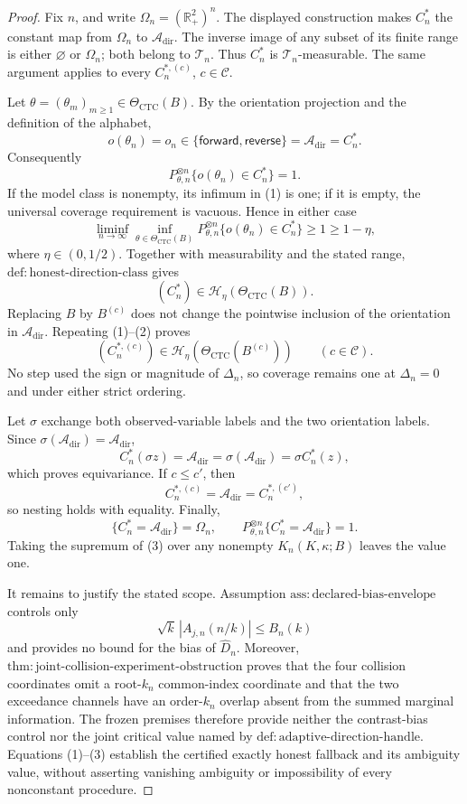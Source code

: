 \documentclass{article}
\begin{document}
\begin{proof}
Fix \(n\), and write \(\Omega_n=(\mathbb R_+^2)^n\).  The displayed construction makes \(C_n^*\) the constant map from \(\Omega_n\) to \(\mathcal A_{\mathrm{dir}}\).  The inverse image of any subset of its finite range is either \(\varnothing\) or \(\Omega_n\); both belong to \(\mathcal T_n\).  Thus \(C_n^*\) is \(\mathcal T_n\)-measurable.  The same argument applies to every \(C_n^{*,(c)}\), \(c\in\mathcal C\).

Let \(\theta=(\theta_m)_{m\geq1}\in\Theta_{\mathrm{CTC}}(B)\).  By the orientation projection and the definition of the alphabet,
\[
 o(\theta_n)=o_n\in\{\mathsf{forward},\mathsf{reverse}\}
 =\mathcal A_{\mathrm{dir}}=C_n^*.
\]
Consequently
\[
 P_{\theta,n}^{\otimes n}\{o(\theta_n)\in C_n^*\}=1. \tag{1}
\]
If the model class is nonempty, its infimum in (1) is one; if it is empty, the universal coverage requirement is vacuous.  Hence in either case
\[
 \liminf_{n\to\infty}\inf_{\theta\in\Theta_{\mathrm{CTC}}(B)}
 P_{\theta,n}^{\otimes n}\{o(\theta_n)\in C_n^*\}
 \geq1\geq1-\eta,
\]
where \(\eta\in(0,1/2)\).  Together with measurability and the stated range, \(\mathrm{def{:}honest\text{-}direction\text{-}class}\) gives
\[
 (C_n^*)\in\mathcal H_\eta(\Theta_{\mathrm{CTC}}(B)). \tag{2}
\]
Replacing \(B\) by \(B^{(c)}\) does not change the pointwise inclusion of the orientation in \(\mathcal A_{\mathrm{dir}}\).  Repeating (1)--(2) proves
\[
 (C_n^{*,(c)})\in\mathcal H_\eta(\Theta_{\mathrm{CTC}}(B^{(c)}))
 \qquad(c\in\mathcal C).
\]
No step used the sign or magnitude of \(\Delta_n\), so coverage remains one at \(\Delta_n=0\) and under either strict ordering.

Let \(\sigma\) exchange both observed-variable labels and the two orientation labels.  Since \(\sigma(\mathcal A_{\mathrm{dir}})=\mathcal A_{\mathrm{dir}}\),
\[
 C_n^*(\sigma z)=\mathcal A_{\mathrm{dir}}
 =\sigma(\mathcal A_{\mathrm{dir}})=\sigma C_n^*(z),
\]
which proves equivariance.  If \(c\leq c'\), then
\[
 C_n^{*,(c)}=\mathcal A_{\mathrm{dir}}=C_n^{*,(c')},
\]
so nesting holds with equality.  Finally,
\[
 \{C_n^*=\mathcal A_{\mathrm{dir}}\}=\Omega_n,
 \qquad
 P_{\theta,n}^{\otimes n}\{C_n^*=\mathcal A_{\mathrm{dir}}\}=1. \tag{3}
\]
Taking the supremum of (3) over any nonempty \(K_n(K,\kappa;B)\) leaves the value one.

It remains to justify the stated scope.  Assumption \(\mathrm{ass{:}declared\text{-}bias\text{-}envelope}\) controls only
\[
 \sqrt{k}\,|A_{j,n}(n/k)|\leq B_n(k)
\]
and provides no bound for the bias of \(\widehat D_n\).  Moreover, \(\mathrm{thm{:}joint\text{-}collision\text{-}experiment\text{-}obstruction}\) proves that the four collision coordinates omit a root-\(k_n\) common-index coordinate and that the two exceedance channels have an order-\(k_n\) overlap absent from the summed marginal information.  The frozen premises therefore provide neither the contrast-bias control nor the joint critical value named by \(\mathrm{def{:}adaptive\text{-}direction\text{-}handle}\).  Equations (1)--(3) establish the certified exactly honest fallback and its ambiguity value, without asserting vanishing ambiguity or impossibility of every nonconstant procedure.
\end{proof}
\end{document}
